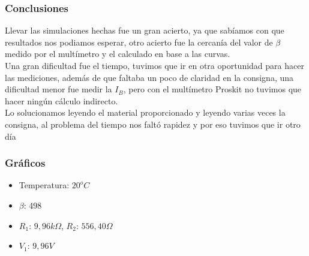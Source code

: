 \subsubsection{Conclusiones}
\sangria Llevar las simulaciones hechas fue un gran acierto, ya que sabíamos con que resultados nos podiamos esperar, otro acierto fue la cercanía del valor de $\beta$ medido por el multímetro y el calculado en base a las curvas. \\
\sangria Una gran dificultad fue el tiempo, tuvimos que ir en otra oportunidad para hacer las mediciones, además de que faltaba un poco de claridad en la consigna, una dificultad menor fue medir la $I_{B}$, pero con el multímetro Proskit no tuvimos que hacer ningún cálculo indirecto. \\
\sangria Lo solucionamos leyendo el material proporcionado y leyendo varias veces la consigna, al problema del tiempo nos faltó rapidez y por eso tuvimos que ir otro día

\valentinoQuitaLasColumnas{}
\subsubsection{Gráficos}

\begin{itemize}[nosep]
    \item Temperatura: $20^oC$
    \item $\beta$: 498
    \item $R_1$: $9,96k\Omega$, $R_2$: $556,40\Omega$ 
    \item $V_1$: $9,96V$
\end{itemize}


